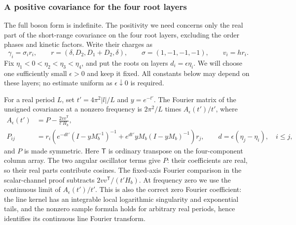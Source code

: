 \subsubsection*{A positive covariance for the four root layers}

The full boson form is indefinite. The positivity we need concerns only
the real part of the short-range covariance on the four root layers,
excluding the order phases and kinetic factors. Write their charges as
\[
 \gamma_i=\sigma_i r_i,\qquad
 r=(\delta,D_2,D_1+D_2,\delta),\qquad
 \sigma=(1,-1,-1,-1),\qquad v_i=hr_i.
\]
Fix $\eta_1<0<\eta_2<\eta_3<\eta_4$, and put the roots on layers
$d_i=\epsilon\eta_i$. We will choose one sufficiently small
$\epsilon>0$ and keep it fixed. All constants below may depend on these
layers; no estimate uniform as $\epsilon\downarrow0$ is required.

For a real period $L$, set $t'=4\pi^2|l|/L$ and $y=e^{-t'}$. The Fourier
matrix of the unsigned covariance at a nonzero frequency is $2\pi^2/L$
times $A_\epsilon(t')/t'$, where
\[
\begin{split}
 A_\epsilon(t')&=P-\frac{2vv^{\mathsf T}}{t'H_b},\\
 P_{ij}&=r_i\left(e^{-dt'}(I-yM_b^{-1})^{-1}
       +e^{dt'}yM_b(I-yM_b)^{-1}\right)r_j,
 \qquad d=\epsilon(\eta_j-\eta_i),\quad i\le j,
\end{split}
\]
and $P$ is made symmetric. Here $\mathsf T$ is ordinary transpose on the
four-component column array. The two angular oscillator terms give $P$:
their coefficients are real, so their real parts contribute cosines.
The fixed-axis Fourier comparison in the scalar-channel proof subtracts
$2vv^{\mathsf T}/(t'H_b)$. At frequency zero we use the continuous limit
of $A_\epsilon(t')/t'$. This is also the correct zero Fourier coefficient:
the line kernel has an integrable local logarithmic singularity and
exponential tails, and the nonzero sample formula holds for arbitrary
real periods, hence identifies its continuous line Fourier transform.

